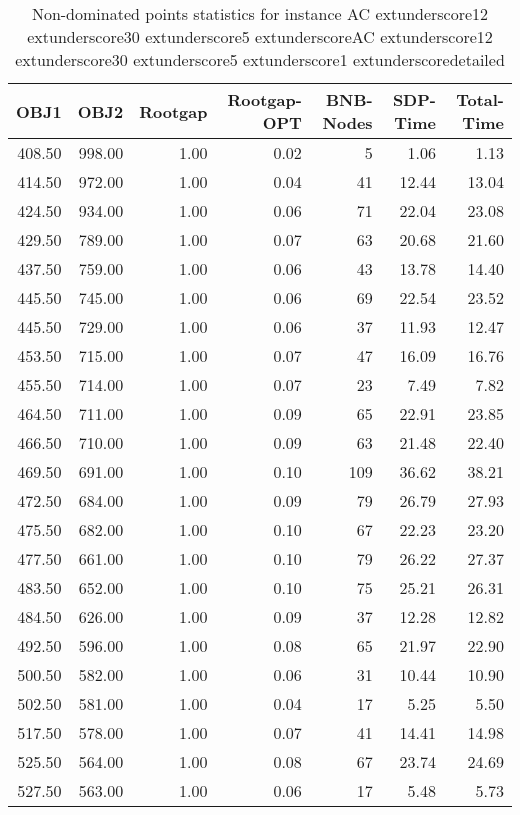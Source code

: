 \begin{table}
\caption{Non-dominated points statistics for instance AC	extunderscore12	extunderscore30	extunderscore5	extunderscoreAC	extunderscore12	extunderscore30	extunderscore5	extunderscore1	extunderscoredetailed}
\label{tab:stats/AC_12_30_5_AC_12_30_5_1_detailed}
\begin{tabular}{rrrrrrr}
\toprule
OBJ1 & OBJ2 & Rootgap & Rootgap-OPT & BNB-Nodes & SDP-Time & Total-Time \\
\midrule
408.50 & 998.00 & 1.00 & 0.02 & 5 & 1.06 & 1.13 \\
414.50 & 972.00 & 1.00 & 0.04 & 41 & 12.44 & 13.04 \\
424.50 & 934.00 & 1.00 & 0.06 & 71 & 22.04 & 23.08 \\
429.50 & 789.00 & 1.00 & 0.07 & 63 & 20.68 & 21.60 \\
437.50 & 759.00 & 1.00 & 0.06 & 43 & 13.78 & 14.40 \\
445.50 & 745.00 & 1.00 & 0.06 & 69 & 22.54 & 23.52 \\
445.50 & 729.00 & 1.00 & 0.06 & 37 & 11.93 & 12.47 \\
453.50 & 715.00 & 1.00 & 0.07 & 47 & 16.09 & 16.76 \\
455.50 & 714.00 & 1.00 & 0.07 & 23 & 7.49 & 7.82 \\
464.50 & 711.00 & 1.00 & 0.09 & 65 & 22.91 & 23.85 \\
466.50 & 710.00 & 1.00 & 0.09 & 63 & 21.48 & 22.40 \\
469.50 & 691.00 & 1.00 & 0.10 & 109 & 36.62 & 38.21 \\
472.50 & 684.00 & 1.00 & 0.09 & 79 & 26.79 & 27.93 \\
475.50 & 682.00 & 1.00 & 0.10 & 67 & 22.23 & 23.20 \\
477.50 & 661.00 & 1.00 & 0.10 & 79 & 26.22 & 27.37 \\
483.50 & 652.00 & 1.00 & 0.10 & 75 & 25.21 & 26.31 \\
484.50 & 626.00 & 1.00 & 0.09 & 37 & 12.28 & 12.82 \\
492.50 & 596.00 & 1.00 & 0.08 & 65 & 21.97 & 22.90 \\
500.50 & 582.00 & 1.00 & 0.06 & 31 & 10.44 & 10.90 \\
502.50 & 581.00 & 1.00 & 0.04 & 17 & 5.25 & 5.50 \\
517.50 & 578.00 & 1.00 & 0.07 & 41 & 14.41 & 14.98 \\
525.50 & 564.00 & 1.00 & 0.08 & 67 & 23.74 & 24.69 \\
527.50 & 563.00 & 1.00 & 0.06 & 17 & 5.48 & 5.73 \\

\end{tabular}
\end{table}
